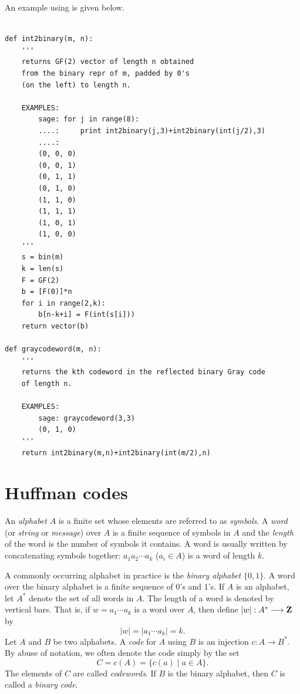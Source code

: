 An example using \sage is given below.

\begin{Verbatim}[fontsize=\scriptsize,fontfamily=courier,fontshape=tt,frame=single,label=\sage]

def int2binary(m, n):
    '''
    returns GF(2) vector of length n obtained
    from the binary repr of m, padded by 0's
    (on the left) to length n.

    EXAMPLES:
        sage: for j in range(8):
        ....:     print int2binary(j,3)+int2binary(int(j/2),3)
        ....:
        (0, 0, 0)
        (0, 0, 1)
        (0, 1, 1)
        (0, 1, 0)
        (1, 1, 0)
        (1, 1, 1)
        (1, 0, 1)
        (1, 0, 0)
    '''
    s = bin(m)
    k = len(s)
    F = GF(2)
    b = [F(0)]*n
    for i in range(2,k):
        b[n-k+i] = F(int(s[i]))
    return vector(b)

def graycodeword(m, n):
    '''
    returns the kth codeword in the reflected binary Gray code
    of length n.

    EXAMPLES:
        sage: graycodeword(3,3)
        (0, 1, 0)
    '''
    return int2binary(m,n)+int2binary(int(m/2),n)

\end{Verbatim}



\section{Huffman codes}
\label{sec:trees_forests:Huffman_codes}

An \emph{alphabet} $A$ is a finite set whose elements
are referred to as \emph{symbols}. A \emph{word} (or
\emph{string} or \emph{message}) over $A$
is a finite sequence of symbols in $A$ and the \emph{length} of the
word is the number of symbols it contains. A word is usually written
by concatenating symbols together: $a_1 a_2 \cdots a_k$ ($a_i \in A$)
is a word of length $k$.

A commonly occurring alphabet in practice is the \emph{binary alphabet}
$\{0,1\}$. A word over the binary alphabet is a finite sequence of
$0$'s and $1$'s. If $A$ is an alphabet, let $A^*$ denote the set of
all words in $A$. The length of a word is denoted by vertical
bars. That is, if $w = a_1 \cdots a_k$ is a word over $A$, then define
$|w|: A^* \longrightarrow \mathbf{Z}$ by
\[
|w|
=
|a_1 \cdots a_k|
=
k.
\]
Let $A$ and $B$ be two alphabets. A \emph{code} for $A$
using $B$ is an injection $c: A \longrightarrow B^*$. By abuse of
notation, we often denote the code simply by the set
\[
C
=
c(A)
=
\{c(a) \;|\; a \in A\}.
\]
The elements of $C$ are called \emph{codewords}. If
$B$ is the binary alphabet, then $C$ is called a
\emph{binary code}.


